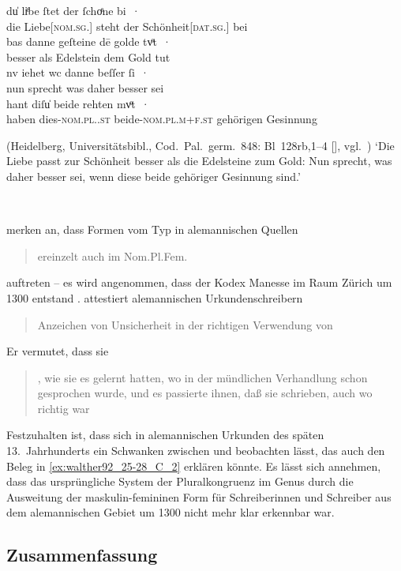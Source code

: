 \begin{exe}
\ex\label{ex:walther92_25-28_C_2}
	\gll du̍ liͤbe ſtet der ſchoͤne bi~· \\
		die Liebe[\textsc{nom.sg.\FemI}] steht der Schönheit[\textsc{dat.sg.\FemI}] bei \\
\sn \gll bas danne geſteine dē golde tvͦt~· \\
		besser als Edelstein dem Gold tut \\
\sn \gll nv iehet wc danne beſſer ſi~· \\
		nun sprecht was daher besser sei \\
\sn \gll hant diſu̍ beide rehten mvͦt~· \\
		haben dies-\textsc{nom.pl.\NeutI.st} beide-\textsc{nom.pl.m+f\subI.st} gehörigen Gesinnung \\
	\begin{taggedline}{(Heidelberg, Universitätsbibl., Cod.~Pal.~germ.~848: Bl~128rb,1--4 [\cite[4957]{hsc}], vgl.~\cite[356--358]{bein2013})}
	\trans `Die Liebe passt zur Schönheit besser als die Edelsteine zum
	Gold: Nun sprecht, was daher besser sei, wenn diese beide gehöriger
	Gesinnung sind.' %
	\end{taggedline}
	\\
\end{exe}

\citeauthor{ksw2} merken an, dass Formen vom Typ  in alemannischen
Quellen \blockcquote[485]{ksw2}{ereinzelt auch im Nom.Pl.Fem.}
auftreten -- es wird angenommen, dass der Kodex Manesse im Raum Zürich um 1300
entstand \autocite[4957]{hsc}.  attestiert alemannischen
Urkundenschreibern \blockcquote[27]{deboor1976b}{Anzeichen von Unsicherheit in
der richtigen Verwendung von }. Er vermutet, dass sie
\blockcquote[28]{deboor1976b}{ , wie sie es
gelernt hatten, wo in der mündlichen Verhandlung schon  gesprochen
wurde, und es passierte ihnen, daß sie  schrieben, auch wo
 richtig war}. Festzuhalten ist, dass sich in alemannischen Urkunden
des späten 13.~Jahrhunderts ein Schwanken zwischen  und 
beobachten lässt, das auch den Beleg in \cref{ex:walther92_25-28_C_2} erklären
könnte. Es lässt sich annehmen, dass das ursprüngliche System der
Pluralkongruenz im Genus durch die Ausweitung der maskulin-femininen Form für
Schreiberinnen und Schreiber aus dem alemannischen Gebiet um 1300 nicht mehr
klar erkennbar war.

\subsection{Zusammenfassung}

